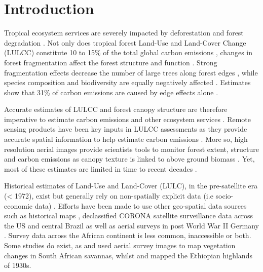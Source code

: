 \documentclass[remote sensing,article,submit,moreauthors,pdftex]{mdpi}
\begin{document}

\hypertarget{introduction}{%
\section{Introduction}\label{introduction}}

Tropical ecosystem services are severely impacted by deforestation and
forest degradation \citep{hansen2013, houghton2012, tyukavina2015}. Not
only does tropical forest Land-Use and Land-Cover Change (LULCC)
constitute 10 to 15\% of the total global carbon emissions
\citep{vanderwerf2009}, changes in forest fragmentation affect the
forest structure and function
\citep{fauset2017, brinck2017, didham1999}. Strong fragmentation effects
decrease the number of large trees along forest edges
\citep{laurance2000, magnago2015}, while species composition and
biodiversity are equally negatively affected
\citep{poorter2006, barlow2016, vandeperre2018}. Estimates show that
31\% of carbon emissions are caused by edge effects alone
\citep{brinck2017}.

Accurate estimates of LULCC and forest canopy structure are therefore
imperative to estimate carbon emissions and other ecosystem services
\citep{houghton2012, hansen2013}. Remote sensing products have been key
inputs in LULCC assessments as they provide accurate spatial information
to help estimate carbon emissions \citep{mitchard2018, hansen2013}. More
so, high resolution aerial images provide scientists tools to monitor
forest extent, structure and carbon emissions as canopy texture is
linked to above ground biomass
\citep{Ploton2012, Couteron2005, Barbier2010}. Yet, most of these
estimates are limited in time to recent decades
\citep{defries2002, houghton2012, hansen2013, achard2014}.

Historical estimates of Land-Use and Land-Cover (LULC), in the
pre-satellite era (\textless{} 1972), exist but generally rely on
non-spatially explicit data (i.e socio-economic data)
\citep{houghton2012, ramankutty1999, defries2002, sader1988}. Efforts
have been made to use other geo-spatial data sources such as historical
maps \citep{willcock2016}, declassified CORONA satellite surveillance
data across the US and central Brazil \citep{song2015} as well as aerial
surveys in post World War II Germany \citep{nita2018}. Survey data
across the African continent is less common, inaccessible or both. Some
studies do exist, as \citet{buitenwerf2012} and \citet{hudak1998} used
aerial survey images to map vegetation changes in South African
savannas, whilst \citet{frankl2015} and \citet{nyssen2016} mapped the
Ethiopian highlands of 1930s.
\end{document}
